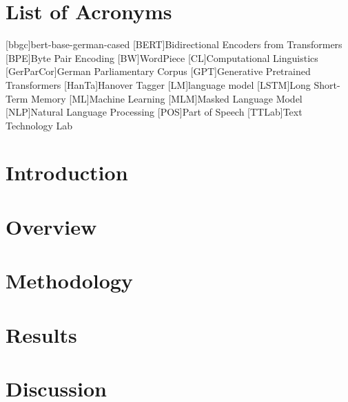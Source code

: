 \documentclass[12pt, a4paper, english]{ttlab-qualify}
\begin{document}
    \chapter*{List of Acronyms}
    \begin{acronym}
        [bbgc]{bert-base-german-cased}
        [BERT]{Bidirectional Encoders from Transformers}
        [BPE]{Byte Pair Encoding}
        [BW]{WordPiece}
        [CL]{Computational Linguistics}
        [GerParCor]{German Parliamentary Corpus}
        [GPT]{Generative Pretrained Transformers}
        [HanTa]{Hanover Tagger}
        [LM]{language model}
        [LSTM]{Long Short-Term Memory}
        [ML]{Machine Learning}
        [MLM]{Masked Language Model}
        [NLP]{Natural Language Processing}
        [POS]{Part of Speech}
        [TTLab]{Text Technology Lab}


    \end{acronym}

    \cleardoubleoddpage


    \chapter{Introduction}
    \setcounter{page}{1}
    \label{ch:introduction}
    

    \chapter{Overview}
    \label{ch:overview}
    


    \chapter{Methodology}
    \label{ch:methodology}
    


    \chapter{Results}
    \label{ch:results}
    


    \chapter{Discussion}
    \label{ch:discussion}
    
\end{document}
